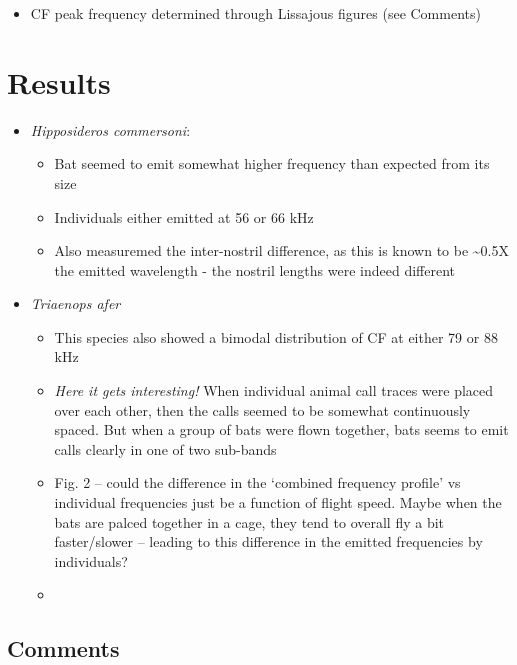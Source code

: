 \documentclass[
]{book}
\providecommand{\tightlist}{%
  \setlength{\itemsep}{0pt}\setlength{\parskip}{0pt}}
\begin{document}
\begin{itemize}
\tightlist
\item
  CF peak frequency determined through Lissajous figures (see Comments)
\end{itemize}

\hypertarget{results-5}{%
\section{Results}\label{results-5}}

\begin{itemize}
\tightlist
\item
  \emph{Hipposideros commersoni}:

  \begin{itemize}
  \tightlist
  \item
    Bat seemed to emit somewhat higher frequency than expected from its size
  \item
    Individuals either emitted at 56 or 66 kHz
  \item
    Also measuremed the inter-nostril difference, as this is known to be \textasciitilde0.5X the emitted wavelength - the nostril lengths were indeed different
  \end{itemize}
\item
  \emph{Triaenops afer}

  \begin{itemize}
  \tightlist
  \item
    This species also showed a bimodal distribution of CF at either 79 or 88 kHz
  \item
    \emph{Here it gets interesting!} When individual animal call traces were placed over each other, then the calls seemed to be somewhat continuously spaced. But when a group of bats were flown together, bats seems to emit calls clearly in one of two sub-bands
  \item
    Fig. 2 -- could the difference in the `combined frequency profile' vs individual frequencies just be a function of flight speed. Maybe when the bats are palced together in a cage, they tend to overall fly a bit faster/slower -- leading to this difference in the emitted frequencies by individuals?
  \item
  \end{itemize}
\end{itemize}

\hypertarget{comments-3}{%
\subsection{Comments}\label{comments-3}}
\end{document}
